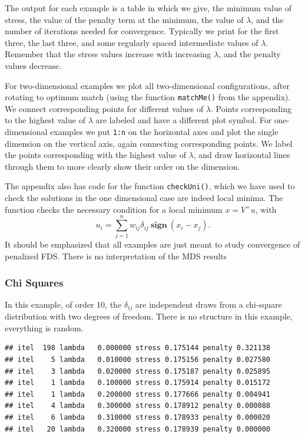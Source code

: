 \documentclass[
  12pt,
]{book}
\theoremstyle{definition}
\theoremstyle{definition}
\theoremstyle{definition}
\theoremstyle{definition}
\theoremstyle{remark}
\begin{document}
The output for each example is a table in which we give, the minimum value of stress, the value of the penalty term at the minimum, the value of \(\lambda\), and the number of iterations needed for convergence. Typically we print for the first three, the last three, and some regularly spaced intermediate values of \(\lambda\). Remember that the stress values increase with increasing \(\lambda\), and the penalty values decrease.

For two-dimensional examples we plot all two-dimensional configurations, after rotating to optimum match (using the function \texttt{matchMe()} from the appendix). We connect corresponding points for different values of \(\lambda\). Points corresponding to the highest value of \(\lambda\) are labeled and have a different plot symbol. For one-dimensional examples we put \texttt{1:n} on the horizontal axes and plot the single dimension on the vertical axis, again connecting corresponding points. We label the points corresponding with the highest value of \(\lambda\), and draw horizontal lines through them to more clearly show their order on the dimension.

The appendix also has code for the function \texttt{checkUni()}, which we have used to check the solutions in the one dimensional case are indeed local minima. The function checks the necessary condition for a local minimum \(x=V^+u\), with
\[
u_i=\sum_{j=1}^nw_{ij}\delta_{ij}\ \mathbf{sign}\ (x_i-x_j).
\]
It should be emphasized that all examples are just meant to study convergence of penalized FDS. There is no interpretation of the MDS results

\hypertarget{chi-squares}{%
\subsubsection{Chi Squares}\label{chi-squares}}

In this example, of order 10, the \(\delta_{ij}\) are independent draws from a chi-square distribution with two degrees of freedom. There is no structure in this example, everything is random.

\begin{verbatim}
## itel  198 lambda   0.000000 stress 0.175144 penalty 0.321138 
## itel    5 lambda   0.010000 stress 0.175156 penalty 0.027580 
## itel    3 lambda   0.020000 stress 0.175187 penalty 0.025895 
## itel    1 lambda   0.100000 stress 0.175914 penalty 0.015172 
## itel    1 lambda   0.200000 stress 0.177666 penalty 0.004941 
## itel    4 lambda   0.300000 stress 0.178912 penalty 0.000088 
## itel    6 lambda   0.310000 stress 0.178933 penalty 0.000020 
## itel   20 lambda   0.320000 stress 0.178939 penalty 0.000000
\end{verbatim}
\end{document}
